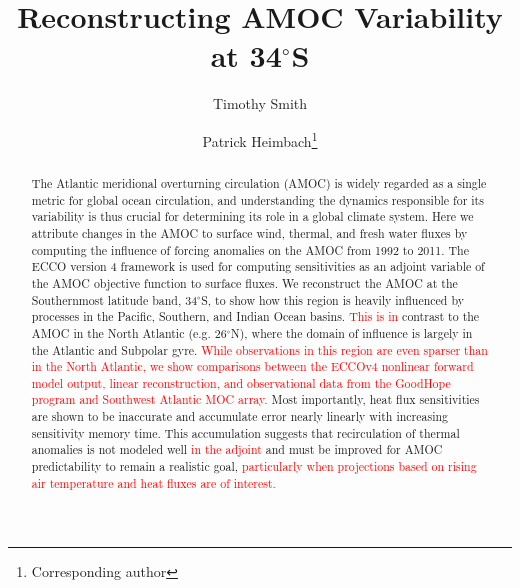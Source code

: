 \documentclass[a4paper,11pt]{article}
\date{\vspace{-3ex}}
\newcommand{\red}[1]{\textcolor{red}{#1}}
\begin{document}
\title{Reconstructing AMOC Variability at 34$^{\circ}$S}
\author[1]{Timothy Smith}
\author[1,2]{Patrick Heimbach\footnote{Corresponding author}}
\maketitle

\begin{abstract}

  The Atlantic meridional overturning circulation (AMOC) is widely regarded as a single metric for global ocean circulation, and understanding the dynamics responsible for its variability is thus crucial for determining its role in a global climate system. Here we attribute changes in the AMOC to surface wind, thermal, and fresh water fluxes by computing the influence of forcing anomalies on the AMOC from 1992 to 2011. The ECCO version 4 framework is used for computing sensitivities as an adjoint variable of the AMOC objective function to surface fluxes. We reconstruct the AMOC at the Southernmost latitude band, 34$^{\circ}$S, to show how this region is heavily influenced by processes in the Pacific, Southern, and Indian Ocean basins. \red{This is in} contrast to the AMOC in the North Atlantic (e.g. 26$^{\circ}$N), where the domain of influence is largely in the Atlantic and Subpolar gyre. \red{While observations in this region are even sparser than in the North Atlantic, we show comparisons between the ECCOv4 nonlinear forward model output, linear reconstruction, and observational data from the GoodHope program and Southwest Atlantic MOC array.} Most importantly, heat flux sensitivities are shown to be inaccurate and accumulate error nearly linearly with increasing sensitivity memory time. This accumulation suggests that recirculation of thermal anomalies is not modeled well \red{in the adjoint} and must be improved for AMOC predictability to remain a realistic goal, \red{particularly when projections based on rising air temperature and heat fluxes are of interest.}
  

\end{abstract}
\end{document}
